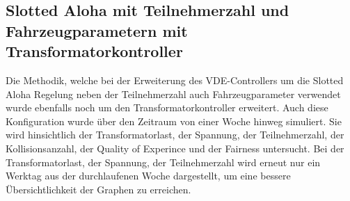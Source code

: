 \subsection{Slotted Aloha mit Teilnehmerzahl und Fahrzeugparametern mit Transformatorkontroller}
\label{chap_SAwtT}
Die Methodik, welche bei der Erweiterung des VDE-Controllers um die Slotted Aloha Regelung neben der Teilnehmerzahl auch Fahrzeugparameter verwendet wurde ebenfalls noch um den Transformatorkontroller erweitert. Auch diese Konfiguration wurde über den Zeitraum von einer Woche hinweg simuliert. Sie wird hinsichtlich der Transformatorlast, der Spannung, der Teilnehmerzahl, der Kollisionsanzahl, der Quality of Experince und der Fairness untersucht. Bei der Transformatorlast, der Spannung, der Teilnehmerzahl wird erneut nur ein Werktag aus der durchlaufenen Woche dargestellt, um eine bessere Übersichtlichkeit der Graphen zu erreichen.\\
